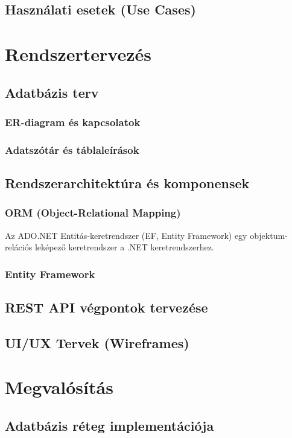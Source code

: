 \documentclass[colorlinks]{thesis-kando}
\theoremstyle{definition}
\theoremstyle{remark}
\begin{document}
\section{Használati esetek (Use Cases)}

\chapter{Rendszertervezés}
\section{Adatbázis terv}
\subsection{ER-diagram és kapcsolatok}
\subsection{Adatszótár és táblaleírások}
\section{Rendszerarchitektúra és komponensek}
\subsection{ORM (Object-Relational Mapping)}

Az ADO.NET Entitás-keretrendszer (EF, Entity Framework) egy objektum-relációs leképező keretrendszer a .NET keretrendszerhez.{\cite{Entity}}
\subsection{Entity Framework}
\section{REST API végpontok tervezése}
\section{UI/UX Tervek (Wireframes)}

\chapter{Megvalósítás}
\section{Adatbázis réteg implementációja}
\end{document}
